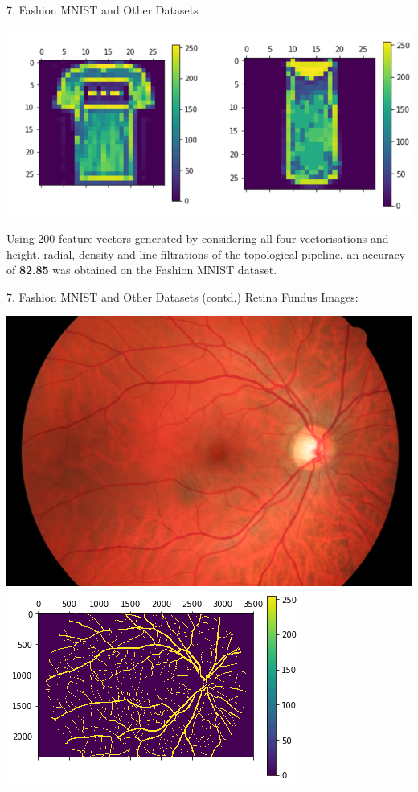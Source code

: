 \documentclass{beamer}
\begin{document}
\begin{frame}{7. Fashion MNIST and Other Datasets}
\begin{center}
\includegraphics[width=\linewidth,height=0.8\textheight,keepaspectratio]{img7}
\end{center}
Using 200 feature vectors generated by considering all four vectorisations and height, radial, density and line filtrations of the topological pipeline, an accuracy of \textbf{82.85} was obtained on the Fashion MNIST dataset.
\end{frame}

\begin{frame}{7. Fashion MNIST and Other Datasets (contd.)}
Retina Fundus Images:
\begin{center}
\includegraphics[width=\linewidth,height=.35\textheight,keepaspectratio]{img5}
\includegraphics[width=\linewidth,height=.50\textheight,keepaspectratio]{img6}
\end{center}
\end{frame}
\end{document}
